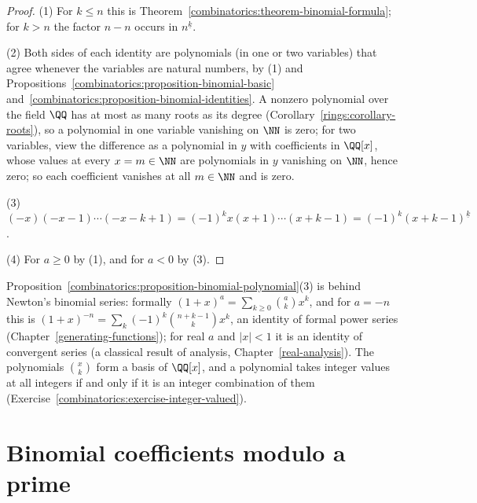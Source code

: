\begin{proof}
(1) For $k \leq n$ this is Theorem~\ref{combinatorics:theorem-binomial-formula}; for $k > n$ the factor $n - n$ occurs in $n^{\underline{k}}$.

(2) Both sides of each identity are polynomials (in one or two variables) that agree whenever the variables are natural numbers, by (1) and Propositions~\ref{combinatorics:proposition-binomial-basic}
and~\ref{combinatorics:proposition-binomial-identities}. A nonzero polynomial over the field $\QQ$ has at most as many roots as its degree (Corollary~\ref{rings:corollary-roots}), so a polynomial in one variable vanishing on $\NN$ is zero; for two variables, view
the difference as a polynomial in $y$ with coefficients in $\QQ[x]$, whose values at every $x = m \in \NN$ are polynomials in $y$ vanishing on $\NN$, hence zero; so each coefficient vanishes at all
$m \in \NN$ and is zero.

(3) $(-x)(-x - 1) \cdots (-x - k + 1) = (-1)^kx(x + 1) \cdots (x + k - 1) = (-1)^k(x + k - 1)^{\underline{k}}$.

(4) For $a \geq 0$ by (1), and for $a < 0$ by (3).
\end{proof}

\begin{remark}\label{combinatorics:remark-newton-series}
Proposition~\ref{combinatorics:proposition-binomial-polynomial}(3) is behind Newton's binomial series: formally $(1 + x)^{a} = \sum_{k \geq 0}\binom{a}{k}x^k$, and for $a = -n$ this is
$(1 + x)^{-n} = \sum_k(-1)^k\binom{n + k - 1}{k}x^k$, an identity of formal power series (Chapter~\ref{generating-functions}); for real $a$ and $|x| < 1$ it is an identity of convergent series (a
classical result of analysis, Chapter~\ref{real-analysis}). The polynomials $\binom{x}{k}$ form a basis of $\QQ[x]$, and a polynomial takes integer values at all integers if and only if it is an integer
combination of them (Exercise~\ref{combinatorics:exercise-integer-valued}).
\end{remark}

\section{Binomial coefficients modulo a prime}\label{combinatorics:section-binomial-primes}

